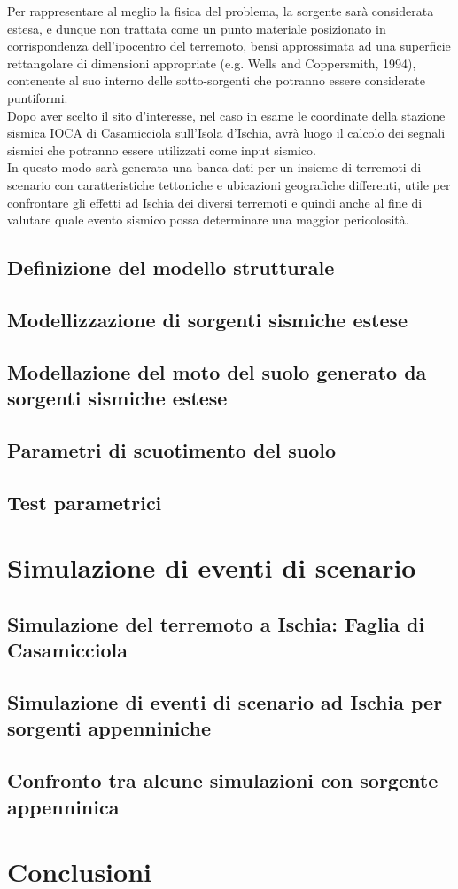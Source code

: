 \documentclass[a4paper,12pt,titlepage]{article}
\begin{document}
Per rappresentare al meglio la fisica del problema, la sorgente sarà considerata estesa, e dunque non trattata come un punto materiale posizionato in corrispondenza dell'ipocentro del terremoto, bensì approssimata ad una superficie rettangolare di dimensioni appropriate (e.g. Wells and Coppersmith, 1994), contenente al suo interno delle sotto-sorgenti che potranno essere considerate puntiformi.\\
Dopo aver scelto il sito d'interesse, nel caso in esame le coordinate della stazione sismica IOCA di Casamicciola sull'Isola d'Ischia, avrà luogo il calcolo dei segnali sismici che potranno essere utilizzati come input sismico.\\
In questo modo sarà generata una banca dati per un insieme di terremoti di scenario con caratteristiche tettoniche e ubicazioni geografiche differenti, utile per confrontare gli effetti ad Ischia dei diversi terremoti e quindi anche al fine di valutare quale evento sismico possa determinare una maggior pericolosità.
\clearpage

\subsection{Definizione del modello strutturale}


\subsection{Modellizzazione di sorgenti sismiche estese}
\subsection{Modellazione del moto del suolo generato da sorgenti sismiche
estese}
\subsection{Parametri di scuotimento del suolo}
\subsection{Test parametrici}

\section{Simulazione di eventi di scenario}
\subsection{Simulazione del terremoto a Ischia: Faglia di Casamicciola}
\subsection{ Simulazione di eventi di scenario ad Ischia per sorgenti appenniniche}
\subsection{Confronto tra alcune simulazioni con sorgente appenninica}

\section*{Conclusioni}
\end{document}
